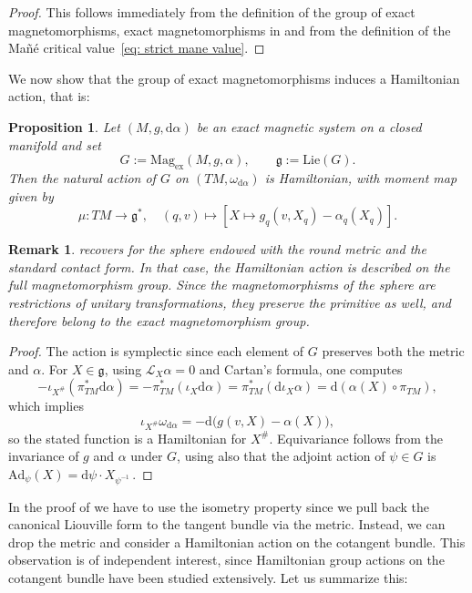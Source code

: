 \documentclass[11pt,reqno]{amsart}
\newcommand{\Lie}{\mathrm{Lie}}
\theoremstyle{plain}
\newtheorem{prop}[thm]{Proposition}
\newtheorem{rem}[thm]{Remark}
\theoremstyle{definition}
\numberwithin{equation}{section}
\def\d{\delta}
\def\d{\delta}
\def\d{{\mathrm{d}}}
\begin{document}
\begin{proof}
    This follows immediately from the definition of the group of exact magnetomorphisms, exact magnetomorphisms in  and from the definition of the Mañé critical value~\eqref{eq: strict mane value}.
\end{proof}
We now show that the group of exact magnetomorphisms induces a Hamiltonian action, that is:
\begin{prop}
\label{thm: Hamiltonian action of ExMag}
Let $(M,g,\d\alpha)$ be an exact magnetic system on a closed manifold and set
\[
G:=\mathrm{Mag}_{\mathrm{ex}}(M,g,\alpha), \qquad \mathfrak g:=\Lie(G).
\]
Then the natural action of $G$ on $(TM,\omega_{\d\alpha})$ is Hamiltonian, with moment map given by
\[
\mu: TM\longrightarrow \mathfrak{g}^*,\quad(q,v)\mapsto \left[ X\mapsto
g_q(v,X_q)-\alpha_q(X_q)\right].
\]
\end{prop}

\begin{rem}
     recovers \cite[Cor.~1.5]{ABM} for the sphere endowed with the round metric and the standard contact form. In that case, the Hamiltonian action is described on the full magnetomorphism group. Since the magnetomorphisms of the sphere are restrictions of unitary transformations, they preserve the primitive as well, and therefore belong to the exact magnetomorphism group.
\end{rem}

\begin{proof}
The action is symplectic since each element of $G$ preserves both the metric and $\alpha$. For $X\in\mathfrak g$, using $\mathcal L_X\alpha=0$ and Cartan's formula, one computes 
\[
- \iota_{X^{\#}} (\pi_{TM}^* \d \alpha) = - \pi_{TM}^* (\iota_X  \d \alpha) = \pi_{TM}^*(\d \iota_X \alpha) = \d (\alpha(X) \circ \pi_{TM}) ,
\]
which implies
\[
\iota_{X^\#}\omega_{\d\alpha}
=
-\d\big(g(v,X)-\alpha(X)\big),
\]
so the stated function is a Hamiltonian for $X^\#$. Equivariance follows from the invariance of $g$ and $\alpha$ under $G$, using also that the adjoint action of $\psi \in G$ is $\mathrm{Ad}_\psi(X) = \d \psi \cdot X_{\psi^{-1}} \,$.
\end{proof}
In the proof of  we have to use the isometry property since we pull back the canonical Liouville form to the tangent bundle via the metric. Instead, we can drop the metric and consider a Hamiltonian action on the cotangent bundle. This observation is of independent interest, since Hamiltonian group actions on the cotangent bundle have been studied extensively. Let us summarize this: 
\end{document}
